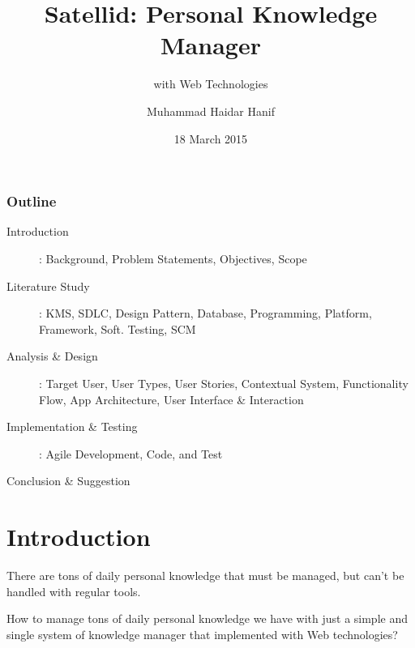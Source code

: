 \documentclass[10pt, compress]{beamer}
\title{Satellid: Personal Knowledge Manager}
\subtitle{with Web Technologies}
\date{18 March 2015}
\author{Muhammad Haidar Hanif}
\institute{Gunadarma University}
\begin{document}

\maketitle


\begin{frame}[fragile]
  \frametitle{Outline}

  \begin{description}
    \item[Introduction]: Background, Problem Statements, Objectives, Scope
    \item[Literature Study]: KMS, SDLC, Design Pattern, Database, Programming, Platform, Framework, Soft. Testing, SCM
    \item[Analysis \& Design]: Target User, User Types, User Stories, Contextual System, Functionality Flow, App Architecture, User Interface \& Interaction
    \item[Implementation \& Testing]: Agile Development, Code, and Test
    \item[Conclusion \& Suggestion]
  \end{description}

\end{frame}


\section{Introduction}


\begin{frame}[fragile]

  \begin{center}
  There are tons of daily personal knowledge that must be managed, but can't be handled with regular tools.
  \end{center}

\end{frame}


\begin{frame}[fragile]

  \begin{center}
  How to manage tons of daily personal knowledge we have with just a simple and single system of knowledge manager that implemented with Web technologies?
  \end{center}

\end{frame}
\end{document}
